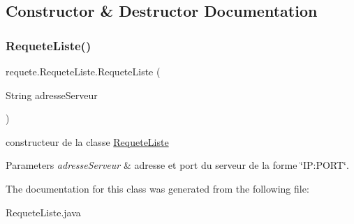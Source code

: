 \subsection{Constructor \& Destructor Documentation}
\mbox{\label{classrequete_1_1RequeteListe_abf11f2cbe8b9eb9eae7621dff966ebd5}} 
\subsubsection{\texorpdfstring{Requete\+Liste()}{RequeteListe()}}
{\footnotesize\ttfamily requete.\+Requete\+Liste.\+Requete\+Liste (\begin{DoxyParamCaption}\item[{String}]{adresse\+Serveur }\end{DoxyParamCaption})\hspace{0.3cm}{\ttfamily [inline]}}



constructeur de la classe \hyperlink{classrequete_1_1RequeteListe}{Requete\+Liste} 


\begin{DoxyParams}{Parameters}
{\em adresse\+Serveur} & adresse et port du serveur de la forme \char`\"{}\+I\+P\+:\+P\+O\+R\+T\char`\"{}. \\
\hline
\end{DoxyParams}


The documentation for this class was generated from the following file\+:\begin{DoxyCompactItemize}
\item 
Requete\+Liste.\+java\end{DoxyCompactItemize}
